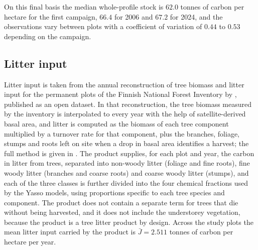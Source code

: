 \documentclass[11pt]{article}
\begin{document}
On this final basis the median whole-profile stock is $62.0$ tonnes of carbon per
hectare for the first campaign, $66.4$ for 2006 and $67.2$ for 2024, and the
observations vary between plots with a coefficient of variation of $0.44$ to $0.53$
depending on the campaign.

\subsection{Litter input}

Litter input is taken from the annual reconstruction of tree biomass and litter input
for the permanent plots of the Finnish National Forest Inventory by
\citet{TupekLitter}, published as an open dataset. In that reconstruction, the tree
biomass measured by the inventory is interpolated to every year with the help of
satellite-derived basal area, and litter is computed as the biomass of each tree
component multiplied by a turnover rate for that component, plus the branches,
foliage, stumps and roots left on site when a drop in basal area identifies a
harvest; the full method is given in \citet{TupekLitter}. The product supplies, for
each plot and year, the carbon in litter from trees, separated into non-woody litter
(foliage and fine roots), fine woody litter (branches and coarse roots) and coarse
woody litter (stumps), and each of the three classes is further divided into the four
chemical fractions used by the Yasso models, using proportions specific to each tree
species and component. The product does not contain a separate term for trees that
die without being harvested, and it does not include the understorey vegetation,
because the product is a tree litter product by design. Across the study plots the mean litter input carried
by the product is $\bar{J} = 2.511$ tonnes of carbon per hectare per year.
\end{document}
